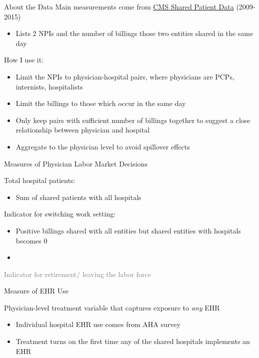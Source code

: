 \documentclass[10pt]{beamer}
\begin{document}
\begin{frame}{About the Data}
    Main measurements come from \underline{CMS Shared Patient Data} (2009-2015)
    \begin{itemize}
        \item Lists 2 NPIs and the number of billings those two entities shared in the same day
    \end{itemize}
    
    How I use it:
    \begin{itemize}
        \item Limit the NPIs to physician-hospital pairs, where physicians are PCPs, internists, hospitalists
        \item Limit the billings to those which occur in the same day
        \item Only keep pairs with sufficient number of billings together to suggest a close relationship between physician and hospital
        \item Aggregate to the physician level to avoid spillover effects
    \end{itemize}
\end{frame}


\begin{frame}{Measures of Physician Labor Market Decisions}


     Total hospital patients: 
    \begin{itemize}
        \item Sum of shared patients with all hospitals
    \end{itemize}
     
     \vspace{4mm}
     
     Indicator for switching work setting:
    \begin{itemize}
        \item Positive billings shared with all entities but shared entities with hospitals becomes 0
        \item \color{gray}{SK$\&$A database of office-based physicians}
    \end{itemize}
    
    \vspace{4mm}
    
    \textcolor{gray}
     {Indicator for retirement/ leaving the labor force}

\end{frame}

\begin{frame}{Measure of EHR Use}

Physician-level treatment variable that captures exposure to \textit{any} EHR
\begin{itemize}
    \item Individual hospital EHR use comes from AHA survey
    \item Treatment turns on the first time any of the shared hospitals implements an EHR
\end{itemize}
\end{frame}
\end{document}
